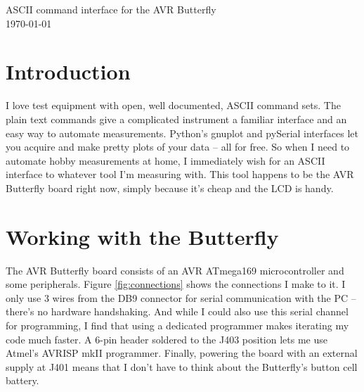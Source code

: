 
\graphicspath{
              {figs/} %
              {pngs/} %
}

\newcommand{\isdraft}{1} %
\doublespacing{} %






\begin{center}
	{\huge ASCII command interface for the AVR Butterfly}\\
	\today
\end{center}



\section{Introduction}
I love test equipment with open, well documented, ASCII command sets.  The plain text commands give a complicated instrument a familiar interface and an easy way to automate measurements.  Python's gnuplot and pySerial interfaces let you acquire and make pretty plots of your data -- all for free\cite{pyserial,gnuplot-py}. So when I need to automate hobby measurements at home, I immediately wish for an ASCII interface to whatever tool I'm measuring with.  This tool happens to be the AVR Butterfly board right now, simply because it's cheap and the LCD is handy.  

\clearpage
\section{Working with the Butterfly}
The AVR Butterfly board consists of an AVR ATmega169 microcontroller and some peripherals.  Figure \ref{fig:connections} shows the connections I make to it.  I only use 3 wires from the DB9 connector for serial communication with the PC -- there's no hardware handshaking.  And while I could also use this serial channel for programming, I find that using a dedicated programmer makes iterating my code much faster.  A 6-pin header soldered to the J403 position lets me use Atmel's AVRISP mkII programmer.  Finally, powering the board with an external supply at J401 means that I don't have to think about the Butterfly's button cell battery.

